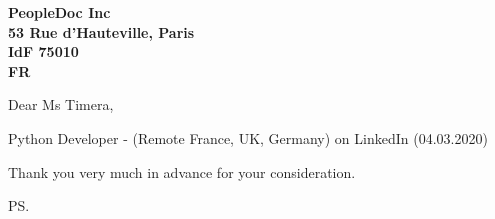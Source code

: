\documentclass[a4paper]{cover-letter}
\begin{document}
\longindentation=0pt

\newcommand{\companyName}{PeopleDoc Inc}

\begin{letter}{\bfseries \companyName\\53 Rue d'Hauteville, Paris\\IdF 75010\\FR}


\date{Berlin, \today}

\opening{Dear Ms Timera,}{Python Developer - (Remote France, UK, Germany) on LinkedIn (04.03.2020)}

%



%


\closing{ Thank you very much in advance for your consideration.}
\vspace{20pt}
\ps

\vspace{\fill}

\end{letter}
\end{document}
